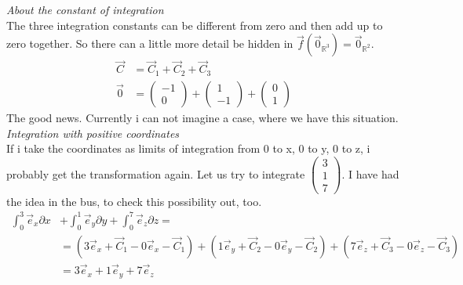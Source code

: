 \documentclass[a4paper]{article}
\begin{document}
\emph{About the constant of integration}\\

The three integration constants can be different from zero and then add up to zero together. So there can a little more detail be hidden in $\vec{f}(\vec{0}_{\mathbb{R}^{3}}) = \vec{0}_{\mathbb{R}^{2}}$.\\
\begin{displaymath}
\begin{align}
\vec{C} &= \vec{C}_{1} + \vec{C}_{2} + \vec{C}_{3} \\
\vec{0} &= \begin{pmatrix}-1\\0\end{pmatrix}+\begin{pmatrix}1\\-1\end{pmatrix}+\begin{pmatrix}0\\1\end{pmatrix}
\end{align}
\end{displaymath}
The good news. Currently i can not imagine a case, where we have this situation.\\

\emph{Integration with positive coordinates}\\

If i take the coordinates as limits of integration from 0 to x, 0 to y, 0 to z, i probably get the transformation again.
Let us try to integrate $\begin{pmatrix}3\\1\\7\end{pmatrix}$. I have had the idea in the bus, to check this possibility out, too.\\

\begin{displaymath}
\begin{align}
\int_{0}^{3}\vec{e}_{x}\partial{x} &+
\int_{0}^{1}\vec{e}_{y}\partial{y} +
\int_{0}^{7}\vec{e}_{z}\partial{z} =\\
&= (3\vec{e}_{x}+\vec{C}_{1}-0\vec{e}_{x}-\vec{C}_{1}) + (1\vec{e}_{y}+\vec{C}_{2}-0\vec{e}_{y}-\vec{C}_{2}) + (7\vec{e}_{z}+\vec{C}_{3}-0\vec{e}_{z}-\vec{C}_{3})\\
&= 3\vec{e}_{x} + 1\vec{e}_{y} + 7\vec{e}_{z}\\
\end{align}
\end{displaymath}
\end{document}
